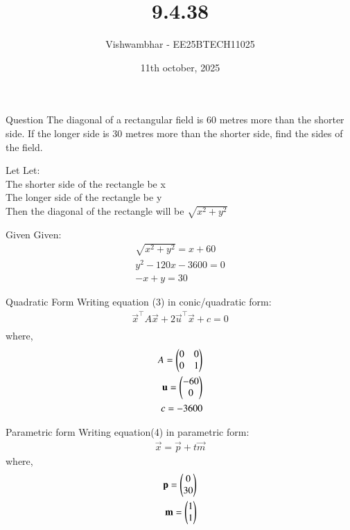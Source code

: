 \documentclass{beamer}
\title{9.4.38}
\date{11th october, 2025}
\author{Vishwambhar - EE25BTECH11025}
\begin{document}
\frame{\titlepage}
\begin{frame}{Question}
The diagonal of a rectangular field is 60 metres more than the shorter side. If the longer side is 30 metres more than the shorter side, find the sides of the field.\\
\end{frame}

\begin{frame}{Let}
Let:\\
The shorter side of the rectangle be x\\
The longer side of the rectangle be y\\
Then the diagonal of the rectangle will be $\sqrt{x^2+y^2}$\\
\end{frame}

\begin{frame}{Given}
Given:
\begin{align}
    \sqrt{x^2+y^2}=x+60\\
    y^2-120x-3600=0\\
    -x+y=30
\end{align}
\end{frame}

\begin{frame}{Quadratic Form}
Writing equation (3) in conic/quadratic form:
\begin{align}
    \vec{x}^\top A\vec{x}+2\vec{u}^\top\vec{x}+c=0\\
\end{align}
where,
\begin{align}
    A=\begin{pmatrix}0&0\\0&1\end{pmatrix}\\
    \mathbf{u} = \begin{pmatrix}-60\\0\end{pmatrix}\\
    c = -3600 
\end{align}
\end{frame}

\begin{frame}{Parametric form}
Writing equation(4) in parametric form:
\begin{align}
    \vec{x} = \vec{p} + t\vec{m}
\end{align}
where,
\begin{align}
    \mathbf{p} = \begin{pmatrix}0\\30\end{pmatrix}\\
    \mathbf{m} = \begin{pmatrix}1\\1\end{pmatrix}
\end{align}
\end{frame}
\end{document}
